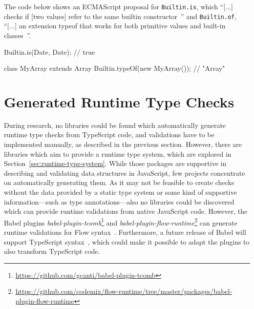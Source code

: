 \begin{program}
\caption{The code below shows an ECMAScript proposal for \texttt{Builtin.is}, which ``[...] checks if [two values] refer to the same builtin constructor~\cite{DynamicTypeChecks:Rauschmayer:2017}'' and \texttt{Builtin.of}, ``[...] an extension typeof that works for both primitive values and built-in classes~\cite{DynamicTypeChecks:Rauschmayer:2017}''.~\cites{DynamicTypeChecks:Rauschmayer:2017, BuiltinProposalRepo}}
\label{prog:runtime-checks-builtin}
\begin{JsCode}
Builtin.is(Date, Date); // true

class MyArray extends Array { }
Builtin.typeOf(new MyArray()); // "Array"
\end{JsCode}
\end{program}


\section{Generated Runtime Type Checks}
\label{sec:existing-projects}

During research, no libraries could be found which automatically generate runtime type checks from TypeScript code, and validations have to be implemented manually, as described in the previous section. However, there are libraries which aim to provide a runtime type system, which are explored in Section~\ref{sec:runtime-type-system}. While those packages are supportive in describing and validating data structures in JavaScript, few projects concentrate on automatically generating them. As it may not be feasible to create checks without the data provided by a static type system or some kind of supportive information---such as type annotations---also no libraries could be discovered which can provide runtime validations from native JavaScript code. However, the Babel plugins \emph{babel-plugin-tcomb}\footnote{\url{https://github.com/gcanti/babel-plugin-tcomb}} and \emph{babel-plugin-flow-runtime}\footnote{\url{https://github.com/codemix/flow-runtime/tree/master/packages/babel-plugin-flow-runtime}} can generate runtime validations for Flow syntax~\cites{RuntimeTypeSystem:tcomb:babel, RuntimeTypeSystem:flow-runtime:babel}. Furthermore, a future release of Babel will support TypeScript syntax~\cite{Babel:TypeScript}, which could make it possible to adapt the plugins to also transform TypeScript code.
